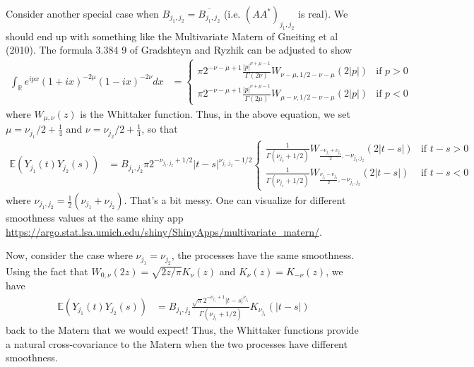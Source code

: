 \documentclass[11pt]{article}
\begin{document}
Consider another special case when $B_{j_1, j_2} = \overline{B_{j_1,j_2}}$ (i.e. $(AA^*)_{j_1, j_2}$ is real). We should end up with something like the Multivariate Matern of Gneiting et al (2010). The formula 3.384 9 of Gradshteyn and Ryzhik can be adjusted to show \begin{align*}
\int_{\mathbb{R}}e^{ipx}(1 + ix)^{-2\mu}(1 -ix)^{-2\nu} dx &= \begin{cases}\pi 2^{-\nu-\mu+1} \frac{|p|^{\nu+\mu-1}}{\Gamma(2 \nu)} W_{\nu - \mu, 1/2 - \nu- \mu}(2|p|) & \textrm{if } p > 0 \\
\pi 2^{-\nu-\mu+1} \frac{|p|^{\nu+\mu-1}}{\Gamma(2 \mu)} W_{\mu - \nu, 1/2 - \nu- \mu}(2|p|)&\textrm{if } p< 0 \end{cases}
\end{align*}where $W_{\mu, \nu}(z)$ is the Whittaker function. Thus, in the above equation, we set $\mu = \nu_{j_1}/2 + \frac{1}{4} $ and $\nu = \nu_{j_2}/2 + \frac{1}{4}$, so that \begin{align*}
\mathbb{E}(Y_{j_1}(t)Y_{j_2}(s)) &= B_{j_1, j_2} \pi 2^{-\nu_{j_1, j_2} + 1/2} |t-s|^{\nu_{j_1, j_2}-  1/2}\begin{cases}
\frac{1}{\Gamma( \nu_{j_2}+ 1/2 )}W_{\frac{-\nu_{j_1} + \nu_{j_2}}{2}, -\nu_{j_1, j_2}}(2|t-s|)&\textrm{if } t-s> 0\\
\frac{1}{\Gamma( \nu_{j_1}+ 1/2)}W_{\frac{\nu_{j_1} - \nu_{j_2}}{2},- \nu_{j_1, j_2}}(2|t-s|)&\textrm{if } t-s< 0
\end{cases}%
\end{align*}where $\nu_{j_1, j_2} = \frac{1}{2}\left(\nu_{j_1}+\nu_{j_2}\right)$. That's a bit messy. One can visualize for different smoothness values at the same shiny app \url{https://argo.stat.lsa.umich.edu/shiny/ShinyApps/multivariate_matern/}.

Now, consider the case where $\nu_{j_1} = \nu_{j_2}$, the processes have the same smoothness. Using the fact that $W_{0, \nu}(2z) = \sqrt{2z/\pi} K_\nu(z)$ and $K_\nu(z) = K_{-\nu}(z)$, we have \begin{align*}
\mathbb{E}(Y_{j_1}(t)Y_{j_2}(s)) &=B_{j_1, j_2} \frac{\sqrt{\pi} 2^{-\nu_{j_1} +1} |t-s|^{\nu_{j_1}}}{\Gamma(\nu_{j_1} + 1/2)} K_{\nu_{j_1}}(|t-s|)
\end{align*}back to the Matern that we would expect! Thus, the Whittaker functions provide a natural cross-covariance to the Matern when the two processes have different smoothness.
\end{document}
